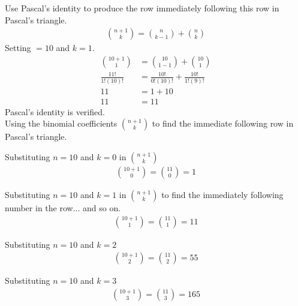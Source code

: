 \documentclass[12pt]{article}
\begin{document}
    Use Pascal's identity to produce the row immediately following this row in Pascal's triangle.
    \begin{equation}
        \begin{split}
            \binom{n+1}{k}=\binom{n}{k-1}+\binom{n}{k}
        \end{split}
    \end{equation}
    Setting $=10$ and $k=1$.
    \begin{equation}
        \begin{split}
            \binom{10+1}{1}&=\binom{10}{1-1}+\binom{10}{1}\\
            \frac{11!}{1!(10)!}&=\frac{10!}{0!(10)!}+\frac{10!}{1!(9)!}\\
            11 &= 1+10\\
            11 &= 11
        \end{split}
    \end{equation}
    Pascal's identity is verified.\\
    Using the binomial coefficients $\binom{n+1}{k}$  to find the immediate following row in Pascal's triangle.
    
   Substituting $n=10$ and $k = 0$ in $\binom{n+1}{k}$ 
    \begin{equation}
        \begin{split}
            \binom{10+1}{0}=\binom{11}{0}=1
        \end{split}
    \end{equation}
   

    Substituting $n=10$ and $k = 1$ in $\binom{n+1}{k}$ to find the immediately following number in the row... and so on.
    \begin{equation}
        \begin{split}
            \binom{10+1}{1}=\binom{11}{1}=11
        \end{split}
    \end{equation}


    Substituting $n=10$ and $k = 2$ 
    \begin{equation}
        \begin{split}
            \binom{10+1}{2}=\binom{11}{2}=55
        \end{split}
    \end{equation}


    Substituting $n=10$ and $k = 3$ 
    \begin{equation}
        \begin{split}
            \binom{10+1}{3}=\binom{11}{3}=165
        \end{split}
    \end{equation}
\end{document}
